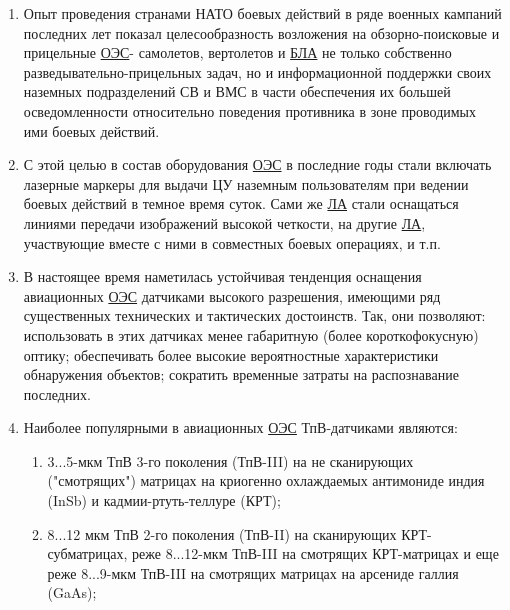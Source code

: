 \begin{enumerate}
	\item Опыт проведения странами НАТО боевых действий в ряде военных кампаний последних лет показал целесообразность возложения на обзорно-поисковые и прицельные  \hyperref[acroEOS]{ОЭС}- самолетов, вертолетов и  \hyperref[acroUAV]{БЛА} не только собственно разведывательно-прицельных задач, но и информационной поддержки своих наземных подразделений СВ и ВМС в части обеспечения их большей осведомленности относительно поведения противника в зоне проводимых ими боевых действий.
	\item С этой целью в состав оборудования  \hyperref[acroEOS]{ОЭС} в последние годы стали включать лазерные маркеры для выдачи ЦУ наземным пользователям при ведении боевых действий в темное время суток. Сами же  \hyperref[acroLA]{ЛА} стали оснащаться линиями передачи изображений высокой четкости, на другие  \hyperref[acroLA]{ЛА}, участвующие вместе с ними в совместных боевых операциях, и т.п.
	\item В настоящее время наметилась устойчивая тенденция оснащения авиационных  \hyperref[acroEOS]{ОЭС} датчиками высокого разрешения, имеющими ряд существенных технических и тактических достоинств. Так, они позволяют: использовать в этих датчиках менее габаритную (более короткофокусную) оптику; обеспечивать более высокие вероятностные характеристики обнаружения объектов; сократить временные затраты на распознавание последних. 
	\item Наиболее популярными в авиационных  \hyperref[acroEOS]{ОЭС} ТпВ-датчиками являются:
	\begin{enumerate}
		\item 3...5-мкм ТпВ 3-го поколения (ТпВ-III) на не сканирующих ("смотрящих") матрицах на криогенно охлаждаемых антимониде индия (InSb) и кадмии-ртуть-теллуре (КРТ); 
		\item 8...12 мкм ТпВ 2-го поколения (ТпВ-II) на сканирующих КРТ-субматрицах, реже 8...12-мкм ТпВ-III на смотрящих КРТ-матрицах и еще реже 8...9-мкм ТпВ-III на смотрящих матрицах на арсениде галлия (GaAs); 
		 

\end{enumerate}
\end{enumerate}
